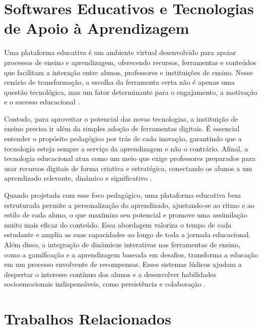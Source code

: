 

\section{Softwares Educativos e Tecnologias de Apoio à Aprendizagem}

Uma plataforma educativa é um ambiente virtual desenvolvido para apoiar processos de ensino e aprendizagem, oferecendo recursos, ferramentas e conteúdos que facilitam a interação entre alunos, professores e instituições de ensino. Nesse cenário de transformação, a escolha da ferramenta certa não é apenas uma questão tecnológica, mas um fator determinante para o engajamento, a motivação e o sucesso educacional \cite{benedetti2025}.

Contudo, para aproveitar o potencial das novas tecnologias, a instituição de ensino precisa ir além da simples adoção de ferramentas digitais. É essencial entender o propósito pedagógico por trás de cada inovação, garantindo que a tecnologia esteja sempre a serviço da aprendizagem e não o contrário. Afinal, a tecnologia educacional atua como um meio que exige professores preparados para usar recursos digitais de forma criativa e estratégica, conectando os alunos a um aprendizado relevante, dinâmico e significativo \cite{mindmakers2025}.

Quando projetada com esse foco pedagógico, uma plataforma educativa bem estruturada permite a personalização do aprendizado, ajustando-se ao ritmo e ao estilo de cada aluno, o que maximiza seu potencial e promove uma assimilação muito mais eficaz do conteúdo. Essa abordagem valoriza o tempo de cada estudante e amplia as suas capacidades ao longo de toda a jornada educacional. Além disso, a integração de dinâmicas interativas nas ferramentas de ensino, como a gamificação e a aprendizagem baseada em desafios, transforma a educação em um processo envolvente de recompensas. Esses sistemas lúdicos ajudam a despertar o interesse contínuo dos alunos e a desenvolver habilidades socioemocionais indispensáveis, como persistência e colaboração \cite{benedetti2025,mindmakers2025}.


\label{sec:softwares-apoio}
 


\section{Trabalhos Relacionados}
\label{sec:trabalhos-relacionados}

